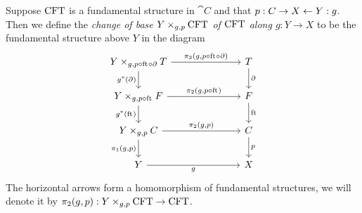 \begin{defn}
Suppose $\mathrm{CFT}$ is a fundamental structure in $\cat{C}$ and that 
$p:C\rightarrow X\leftarrow Y:g$.
Then we define the \emph{change of base $\cobesys{Y}{\stesys}{g}{p}$ of 
$\mathrm{CFT}$ along $g:Y\to X$} to be the fundamental structure above $Y$ in the 
diagram
\begin{equation*}
\begin{tikzcd}[column sep=7em]
\cobesys{Y}{\stesyst}{g}{p\circ\eft\circ\ebd}
  \ar{r}{\pullbackpr{2}{g}{p\circ\eft\circ\ebd}}
  \ar{d}[swap]{g^\ast(\ebd)}
  &
\stesyst
  \ar{d}{\ebd}
  \\
\cobesys{Y}{\stesysf}{g}{p\circ\eft}
  \ar{r}{\pullbackpr{2}{g}{p\circ\eft}}
  \ar{d}[swap]{g^\ast(\eft)}
  &
\stesysf
  \ar{d}{\eft}
  \\
\cobesys{Y}{\stesysc}{g}{p}
  \ar{r}{\pullbackpr{2}{g}{p}}
  \ar{d}[swap]{\pullbackpr{1}{g}{p}}
  &
\stesysc
  \ar{d}{p}
  \\
Y \ar{r}[swap]{g}
  &
X
\end{tikzcd}
\end{equation*}
The horizontal arrows form a homomorphism of fundamental structures, we will
denote it by $\pullbackpr{2}{g}{p}:\cobesys{Y}{\stesys}{g}{p}\to\stesys$.
\end{defn}
